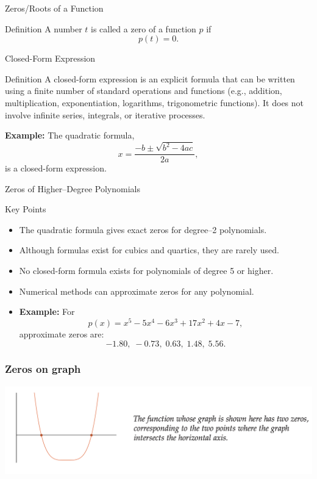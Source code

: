 \documentclass{beamer}
\begin{document}
  \begin{frame}{Zeros/Roots of a Function}
    \begin{block}{Definition}
      A number \(t\) is called a zero of a function \(p\) if
      \[
        p(t) = 0.
      \]
    \end{block}
  \end{frame}

  \begin{frame}{Closed-Form Expression}
    \begin{block}{Definition}
      A closed-form expression is an explicit formula that can be written using a finite number of standard operations and functions (e.g., addition, multiplication, exponentiation, logarithms, trigonometric functions). It does not involve infinite series, integrals, or iterative processes.
    \end{block}
    \vspace{0.5em}
    \textbf{Example:} The quadratic formula,
    \[
      x = \frac{-b \pm \sqrt{b^2-4ac}}{2a},
    \]
    is a closed-form expression.
  \end{frame}
  
  \begin{frame}{Zeros of Higher–Degree Polynomials}
    \begin{block}{Key Points}
      \begin{itemize}
        \item The quadratic formula gives exact zeros for degree–2 polynomials.
        \item Although formulas exist for cubics and quartics, they are rarely used.
        \item No closed-form formula exists for polynomials of degree 5 or higher.
        \item Numerical methods can approximate zeros for any polynomial.
        \item \textbf{Example:} For 
        \[
          p(x)=x^5-5x^4-6x^3+17x^2+4x-7,
        \]
        approximate zeros are:
        \[
          -1.80,\; -0.73,\; 0.63,\; 1.48,\; 5.56.
        \]
      \end{itemize}
    \end{block}
  \end{frame}

\begin{frame}
  \frametitle{Zeros on graph}
  \centering
  \includegraphics[scale=0.23]{zeros.png}

\end{frame}
\end{document}
